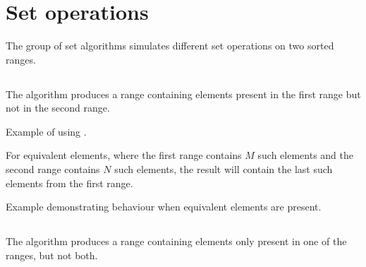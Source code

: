 \section{Set operations}

The group of set algorithms simulates different set operations on two sorted ranges.

\subsection{\texorpdfstring{}{\texttt{std::set\_difference}}}

The  algorithm produces a range containing elements present in the first range but not in the second range.


\begin{codebox}[]{\href{https://compiler-explorer.com/z/WMz45WbW6}{\ExternalLink}}
\footnotesize Example of using .
\tcblower
{}
\end{codebox}

For equivalent elements, where the first range contains $M$ such elements and the second range contains $N$ such elements, the result will contain the last  such elements from the first range.

\begin{codebox}[]{\href{https://compiler-explorer.com/z/YdPnxPh88}{\ExternalLink}}
\footnotesize Example demonstrating  behaviour when equivalent elements are present.
\tcblower
{}
\end{codebox}

\subsection{\texorpdfstring{}{\texttt{std::set\_symmetric\_difference}}}

The  algorithm produces a range containing elements only present in one of the ranges, but not both.

